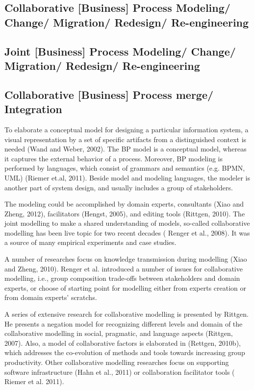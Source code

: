 \documentclass{article}
\begin{document}
\subsection{Collaborative [Business] Process Modeling/ Change/ Migration/ Redesign/ Re-engineering}
 
 \subsection{Joint [Business] Process Modeling/ Change/ Migration/ Redesign/ Re-engineering}

 \subsection{Collaborative [Business] Process merge/ Integration}

To elaborate a conceptual model for designing a particular information system, a visual representation by a set of specific artifacts from a distinguished context is needed (Wand and Weber, 2002). The BP model is a conceptual model, whereas it captures the external behavior of a process. Moreover, BP modeling is performed by languages, which consist of grammars and semantics (e.g. BPMN, UML) (Riemer et.al, 2011). Beside model and modeling languages, the modeler is another part of system design, and usually includes a group of stakeholders.

The modeling could be accomplished by domain experts, consultants (Xiao and Zheng, 2012), facilitators (Hengst, 2005), and editing tools (Rittgen, 2010). The joint modelling to make a shared understanding of models, so-called collaborative modelling has been live topic for two recent decades ( Renger et al., 2008).  It was a source of many empirical experiments and case studies. 

A number of researches focus on knowledge transmission during modelling (Xiao and Zheng, 2010). Renger et al. introduced a number of issues for collaborative modelling, i.e., group composition trade-offs between stakeholders and domain experts, or choose of starting point for modelling either from experts creation or from domain experts’ scratchs. 

A series of extensive research for collaborative modelling is presented by Rittgen. He presents a negation model for recognizing different levels and domain of the collaborative modelling in social, pragmatic, and language aspects (Rittgen, 2007). Also, a model of collaborative factors is elaborated in (Rettgen, 2010b), which addresses the co-evolution of methods and tools towards increasing group productivity.  Other collaborative modelling researches focus on supporting software infrastructure (Hahn et al., 2011) or collaboration facilitator tools ( Riemer et al. 2011).
\end{document}
